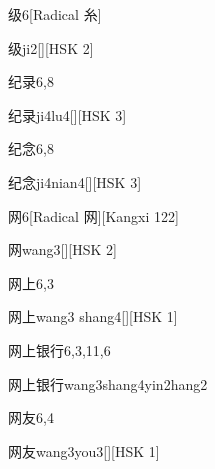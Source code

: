 \begin{entry}{级}{6}[Radical 糸]
  \begin{phonetics}{级}{ji2}[][HSK 2]
  \end{phonetics}
\end{entry}

\begin{entry}{纪录}{6,8}
  \begin{phonetics}{纪录}{ji4lu4}[][HSK 3]
  \end{phonetics}
\end{entry}

\begin{entry}{纪念}{6,8}
  \begin{phonetics}{纪念}{ji4nian4}[][HSK 3]
  \end{phonetics}
\end{entry}

\begin{entry}{网}{6}[Radical 网][Kangxi 122]
  \begin{phonetics}{网}{wang3}[][HSK 2]
  \end{phonetics}
\end{entry}

\begin{entry}{网上}{6,3}
  \begin{phonetics}{网上}{wang3 shang4}[][HSK 1]
  \end{phonetics}
\end{entry}

\begin{entry}{网上银行}{6,3,11,6}
  \begin{phonetics}{网上银行}{wang3shang4yin2hang2}
  \end{phonetics}
\end{entry}

\begin{entry}{网友}{6,4}
  \begin{phonetics}{网友}{wang3you3}[][HSK 1]
  \end{phonetics}
\end{entry}

